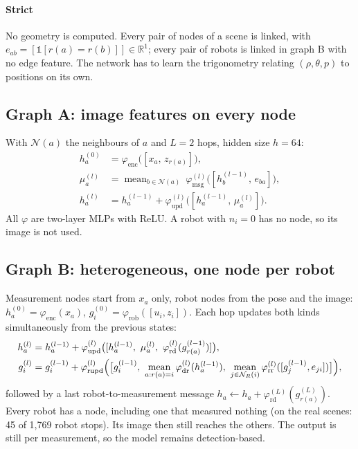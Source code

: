 \documentclass[conference]{IEEEtran}
\newcommand{\R}{\mathbb{R}}
\begin{document}
\paragraph{Strict} No geometry is computed. Every pair of nodes of a scene is linked, with $e_{ab}=[\mathbb
1[r(a)=r(b)]]\in\R^1$; every pair of robots is linked in graph B with no edge feature. The network has to learn the
trigonometry relating $(\rho,\theta,p)$ to positions on its own.

\subsection{Graph A: image features on every node}
With $\mathcal N(a)$ the neighbours of $a$ and $L=2$ hops, hidden size $h=64$:
\begin{align}
h_a^{(0)} &= \varphi_{\text{enc}}\bigl([x_a,\,z_{r(a)}]\bigr),\\
\mu_a^{(l)} &= \operatorname{mean}_{b\in\mathcal N(a)}\ \varphi_{\text{msg}}^{(l)}\bigl([h_b^{(l-1)},\,e_{ba}]\bigr),\\
h_a^{(l)} &= h_a^{(l-1)}+\varphi_{\text{upd}}^{(l)}\bigl([h_a^{(l-1)},\,\mu_a^{(l)}]\bigr).
\end{align}
All $\varphi$ are two-layer MLPs with ReLU. A robot with $n_i=0$ has no node, so its image is not used.

\subsection{Graph B: heterogeneous, one node per robot}
Measurement nodes start from $x_a$ only, robot nodes from the pose and the image:
$h_a^{(0)}=\varphi_{\text{enc}}(x_a)$, $g_i^{(0)}=\varphi_{\text{rob}}([u_i,z_i])$. Each hop updates both kinds
simultaneously from the previous states:
\begin{align}
h_a^{(l)} &= h_a^{(l-1)}+\varphi_{\text{upd}}^{(l)}\bigl([h_a^{(l-1)},\ \mu_a^{(l)},\ \varphi_{\text{rd}}^{(l)}(g_{r(a)}^{(l-1)})]\bigr),\\
g_i^{(l)} &= g_i^{(l-1)}+\varphi_{\text{rupd}}^{(l)}\Bigl(\bigl[g_i^{(l-1)},\ \operatorname*{mean}_{a:r(a)=i}\varphi_{\text{dr}}^{(l)}(h_a^{(l-1)}),\
\operatorname*{mean}_{j\in\mathcal N_R(i)}\varphi_{\text{rr}}^{(l)}([g_j^{(l-1)},e_{ji}])\bigr]\Bigr),
\end{align}
followed by a last robot-to-measurement message $h_a\leftarrow h_a+\varphi_{\text{rd}}^{(L)}(g_{r(a)}^{(L)})$. Every
robot has a node, including one that measured nothing (on the real scenes: 45 of 1,769 robot stops). Its image then
still reaches the others. The output is still per measurement, so the model remains detection-based.
\end{document}
